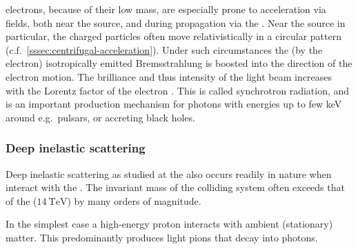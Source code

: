 \CR electrons, because of their low mass, are especially prone to acceleration 
via \EM fields, both near the source, and during propagation via the \GMF. Near
the source in particular, the charged particles often move relativistically in 
a circular pattern (c.f.\ \cref{sssec:centrifugal-acceleration}). Under such
circumstances the (by the electron) isotropically emitted Bremsstrahlung is 
boosted into the direction of the electron motion. The brilliance and
thus intensity of the light beam increases with the Lorentz factor of the 
electron \cite{rybickiRadiativeProcessesAstrophysics2024}. This is called 
synchrotron radiation, and is an important production mechanism for photons 
with energies up to few \unit{\kilo\eV} \cite{gaisserCosmicRaysParticle2016} 
around e.g.\ pulsars, or accreting black holes.

\subsubsection{Deep inelastic scattering}
\label{sssec:deep-inelastic-scattering}

Deep inelastic scattering as studied at the \LHC also occurs readily in nature
when \CRs interact with the \ISM. The invariant mass of the colliding system
often exceeds that of the \LHC ($\SI{14}{\tera\eV}$) by many orders of 
magnitude. 

In the simplest case a high-energy proton interacts with ambient (stationary) 
matter. This predominantly produces light pions that decay into photons.

\vspace{0.5cm}
\begin{centering}
	

\end{centering}
\vspace{0.5cm}

